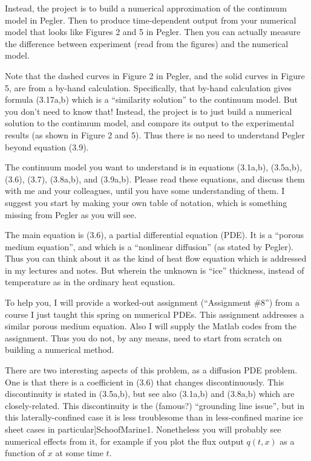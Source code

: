 \documentclass[11pt,final]{amsart}%
\newcommand{\citep}[1]{\cite{#1}}
\begin{document}
Instead, the project is to build a numerical approximation of the continuum model in Pegler.  Then to produce time-dependent output from your numerical model that looks like Figures 2 and 5 in Pegler.  Then you can actually measure the difference between experiment (read from the figures) and the numerical model.

Note that the dashed curves in Figure 2 in Pegler, and the solid curves in Figure 5, are from a by-hand calculation.  Specifically, that by-hand calculation gives formula (3.17a,b) which is a ``similarity solution'' to the continuum model.  But you don't need to know that!  Instead, the project is to just build a numerical solution to the continuum model, and compare its output to the experimental results (as shown in Figure 2 and 5).  Thus there is no need to understand Pegler beyond equation (3.9).

The continuum model you want to understand is in equations (3.1a,b), (3.5a,b), (3.6), (3.7), (3.8a,b), and (3.9a,b).  Please read these equations, and discuss them with me and your colleagues, until you have some understanding of them.  I suggest you start by making your own table of notation, which is something missing from Pegler as you will see.

The main equation is (3.6), a partial differential equation (PDE).  It is a ``porous medium equation'', and which is a ``nonlinear diffusion'' (as stated by Pegler).  Thus you can think about it as the kind of heat flow equation which is addressed in my lectures and notes.  But wherein the unknown is ``ice'' thickness, instead of temperature as in the ordinary heat equation.

To help you, I will provide a worked-out assignment (``Assignment \#8'') from a course I just taught this spring on numerical PDEs.  This assignment addresses a similar porous medium equation.  Also I will supply the Matlab codes from the assignment.  Thus you do not, by any means, need to start from scratch on building a numerical method.

There are two interesting aspects of this problem, as a diffusion PDE problem.  One is that there is a coefficient in (3.6) that changes discontinuously.  This discontinuity is stated in (3.5a,b), but see also (3.1a,b) and (3.8a,b) which are closely-related.  This discontinuity is the (famous?) ``grounding line issue'', but in this laterally-confined case it is less troublesome than in less-confined marine ice sheet cases \citep[in particular]{SchoofMarine1}.  Nonetheless you will probably see numerical effects from it, for example if you plot the flux output $q(t,x)$ as a function of $x$ at some time $t$.
\end{document}
